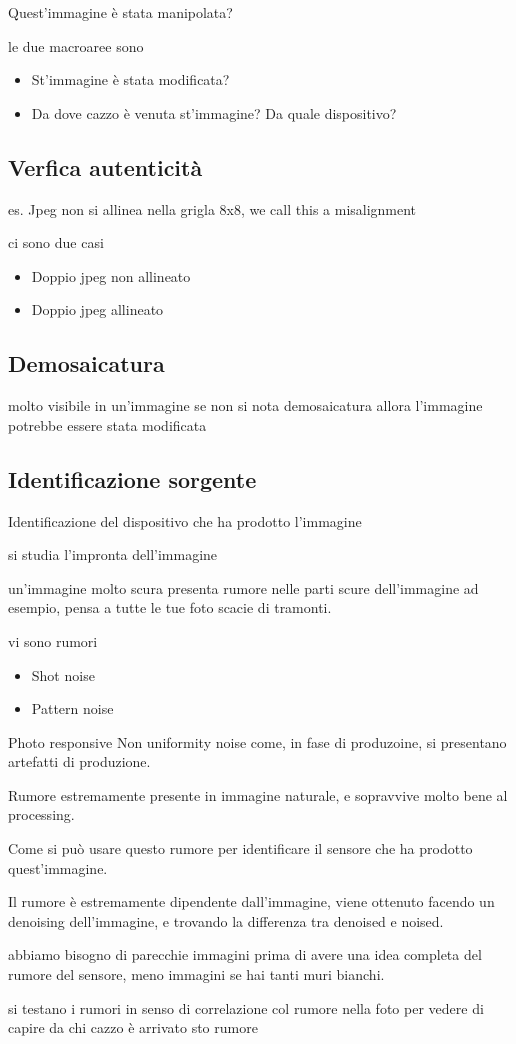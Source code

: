 \documentclass[11pt]{article}
\begin{document}
Quest'immagine è stata manipolata?

le due macroaree sono
\begin{itemize}
\item St'immagine è stata modificata?
\item Da dove cazzo è venuta st'immagine? Da quale dispositivo?
\end{itemize}

\subsection{Verfica autenticità}
\label{sec:org93e11a4}
es. Jpeg non si allinea nella grigla 8x8, we call this a misalignment

ci sono due casi
\begin{itemize}
\item Doppio jpeg non allineato
\item Doppio jpeg allineato
\end{itemize}

\subsection{Demosaicatura}
\label{sec:org7ec94da}
molto visibile in un'immagine
se non si nota demosaicatura allora l'immagine potrebbe essere stata
modificata

\subsection{Identificazione sorgente}
\label{sec:org183c46d}
Identificazione del dispositivo che ha prodotto l'immagine

si studia l'impronta dell'immagine

un'immagine molto scura presenta rumore nelle parti scure
dell'immagine ad esempio, pensa a tutte le tue foto scacie di
tramonti.

vi sono rumori
\begin{itemize}
\item Shot noise
\item Pattern noise
\end{itemize}

Photo responsive Non uniformity noise
come, in fase di produzoine, si presentano artefatti di produzione.

Rumore estremamente presente in immagine naturale, e sopravvive molto
bene al processing.

Come si può usare questo rumore per identificare il sensore che ha
prodotto quest'immagine.

Il rumore è estremamente dipendente dall'immagine, viene ottenuto
facendo un denoising dell'immagine, e trovando la differenza tra
denoised e noised.

abbiamo bisogno di parecchie immagini prima di avere una idea completa
del rumore del sensore, meno immagini se hai tanti muri bianchi.

si testano i rumori in senso di correlazione col rumore nella foto per
vedere di capire da chi cazzo è arrivato sto rumore
\end{document}
